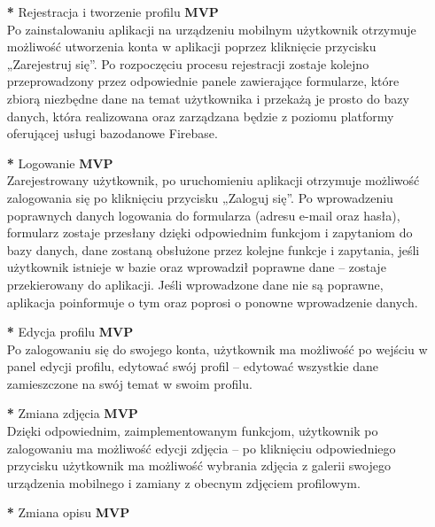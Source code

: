 \documentclass[12pt,a4paper]{article}
\begin{document}
\begin{itemize}\itemsep0pt
\item [\textbf{*}] Rejestracja i tworzenie profilu \textbf{MVP}
\\ 
\newline
Po zainstalowaniu aplikacji na urządzeniu mobilnym użytkownik otrzymuje możliwość utworzenia konta w aplikacji poprzez kliknięcie przycisku „Zarejestruj się”.  Po rozpoczęciu procesu rejestracji zostaje kolejno przeprowadzony  przez odpowiednie panele zawierające formularze, które zbiorą niezbędne dane na temat użytkownika i przekażą je prosto do bazy danych, która realizowana oraz zarządzana będzie z poziomu platformy oferującej usługi bazodanowe  Firebase.  
\\ 
\item [\textbf{*}] Logowanie \textbf{MVP}
\\ 
\newline
Zarejestrowany użytkownik, po uruchomieniu aplikacji otrzymuje możliwość zalogowania się po kliknięciu przycisku „Zaloguj się”. Po wprowadzeniu poprawnych danych logowania do formularza (adresu e-mail oraz hasła), formularz zostaje przesłany dzięki odpowiednim funkcjom i zapytaniom do bazy danych, dane zostaną obsłużone przez kolejne funkcje i zapytania,  jeśli użytkownik istnieje w bazie oraz wprowadził poprawne dane – zostaje przekierowany do aplikacji. Jeśli wprowadzone dane nie są poprawne, aplikacja poinformuje o tym oraz poprosi o ponowne wprowadzenie danych.
\newline
\item [\textbf{*}] Edycja profilu \textbf{MVP}
\\ 
\newline
Po zalogowaniu się do swojego konta, użytkownik ma możliwość po wejściu w panel edycji profilu, edytować swój profil – edytować wszystkie dane zamieszczone na swój temat w swoim profilu.
\newline 
\item [\textbf{*}] Zmiana zdjęcia \textbf{MVP}
\\ 
\newline
Dzięki odpowiednim, zaimplementowanym funkcjom, użytkownik po zalogowaniu ma możliwość edycji zdjęcia – po kliknięciu odpowiedniego przycisku użytkownik ma możliwość wybrania zdjęcia z galerii swojego urządzenia mobilnego i zamiany z obecnym zdjęciem profilowym.
\newline
\item [\textbf{*}] Zmiana opisu \textbf{MVP}
\\ 

\end{itemize}
\end{document}
